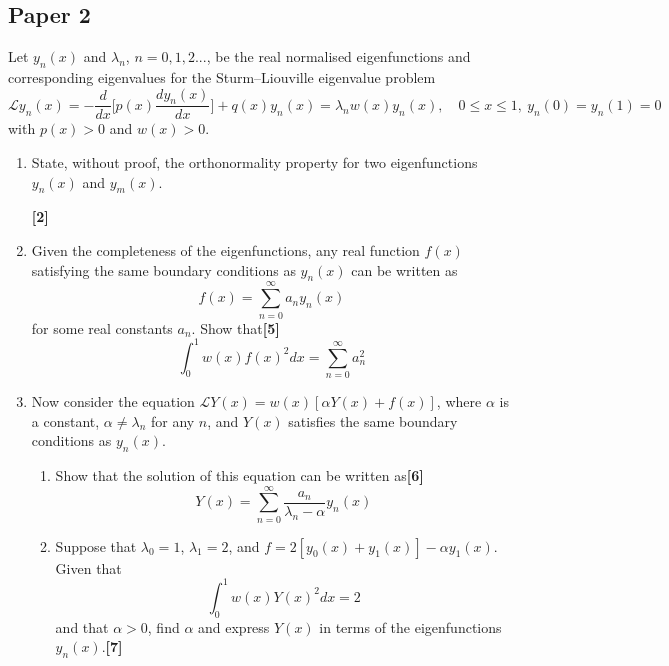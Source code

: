 \documentclass[a4paper]{article}
\begin{document}
\subsection{Paper 2}
\begin{qns}
Let $y_n(x)$ and $\lambda_n$, $n = 0, 1, 2...$, be the real normalised eigenfunctions and corresponding eigenvalues for the Sturm–Liouville eigenvalue problem
$$\mathcal{L}y_n(x)=-\frac{d}{dx}\bigg[p(x)\frac{dy_n(x)}{dx}\bigg]+q(x)y_n(x)=\lambda_nw(x)y_n(x),\quad  0\leq x\leq 1,~y_n(0)=y_n(1)=0$$
with $p(x)>0$ and $w(x)>0$.
\begin{enumerate}[label=(\alph*)]
\item State, without proof, the orthonormality property for two eigenfunctions $y_n(x)$ and $y_m(x)$.

\hfill\textbf{[2]}
\item Given the completeness of the eigenfunctions, any real function $f(x)$ satisfying the same boundary conditions as $y_n(x)$ can be written as
$$f(x)=\sum_{n=0}^\infty a_ny_n(x)$$
for some real constants $a_n$. Show that\hfill\textbf{[5]}
$$\int_0^1w(x)f(x)^2dx=\sum_{n=0}^\infty a_n^2$$
\item Now consider the equation $\mathcal{L}Y(x)=w(x)[\alpha Y(x)+f(x)]$, where $\alpha$ is a constant, $\alpha\neq\lambda_n$ for any $n$, and $Y (x)$ satisfies the same boundary conditions as $y_n(x)$.
\begin{enumerate}[label=(\roman*)]
\item Show that the solution of this equation can be written as\hfill\textbf{[6]}
$$Y(x)=\sum_{n=0}^\infty\frac{a_n}{\lambda_n-\alpha}y_n(x)$$
\item Suppose that $\lambda_0=1$, $\lambda_1=2$, and $f = 2 [y_0(x) + y_1(x)] −\alpha y_1(x)$. Given that
$$\int_0^1w(x)Y(x)^2dx=2$$
and that $\alpha>0$, find $\alpha$ and express $Y (x)$ in terms of the eigenfunctions $y_n(x)$.\hfill\textbf{[7]}
\end{enumerate}
\end{enumerate}
\end{qns}
\end{document}
